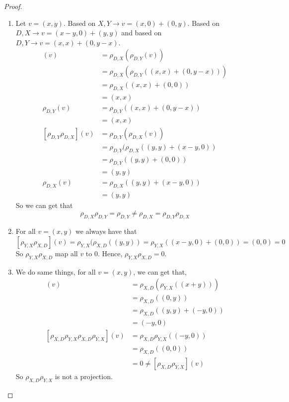 \documentclass[a4paper]{article}
\begin{document}
\begin{description}
\begin{proof}\
  \begin{enumerate}[ i) ]
    \item Let $v=(x,y)$. Based on $X, Y\to v=(x,0)+(0,y)$. Based on $D, X\to v=(x-y,0)+(y,y)$ and based on $D, Y\to v=(x,x)+(0,y-x)$.
    \begin{align*}
      [\rho_{D,X}\rho_{D,Y}](v)&=\rho_{D,X}(\rho_{D,Y}(v))\\
      &=\rho_{D,X}(\rho_{D,Y}((x,x)+(0,y-x)))\\
      &=\rho_{D,X}((x,x)+(0,0))\\
      &=(x,x)\\
      \rho_{D,Y}(v)&=\rho_{D,Y}((x,x)+(0,y-x))\\
      &=(x,x)\\
      [\rho_{D,Y}\rho_{D,X}](v)&=\rho_{D,Y}(\rho_{D,X}(v))\\
      &=\rho_{D,Y}(\rho_{D,X}((y,y)+(x-y,0))\\
      &=\rho_{D,Y}((y,y)+(0,0))\\
      &=(y,y)\\
      \rho_{D,X}(v)&=\rho_{D,X}((y,y)+(x-y,0))\\
      &=(y,y)
    \end{align*}
    So we can get that $$\rho_{D,X}\rho_{D,Y} = \rho_{D,Y} \neq \rho_{D,X} = \rho_{D,Y} \rho_{D,X}$$
    \item For all $v=(x,y)$ we always have that
    $$[\rho_{Y,X}\rho_{X,D}](v)=\rho_{Y,X}(\rho_{X,D}((y,y))=\rho_{Y,X}((x-y,0)+(0,0))=(0,0)=0$$
    So $\rho_{Y,X}\rho_{X,D}$ map all $v$ to $0$. Hence, $\rho_{Y,X}\rho_{X,D} = 0$.
    \item We do same things, for all $v=(x,y)$, we can get that,
    \begin{align*}
      [\rho_{X,D}\rho_{Y,X}](v)&=\rho_{X,D}(\rho_{Y,X}((x+y)))\\
      &=\rho_{X,D}((0,y))\\
      &=\rho_{X,D}((y,y)+(-y,0))\\
      &=(-y,0)\\
      [\rho_{X,D}\rho_{Y,X}\rho_{X,D}\rho_{Y,X}](v)&=\rho_{X,D}\rho_{Y,X}((-y,0))\\
      &=\rho_{X,D}((0,0))\\
      &=0\neq [\rho_{X,D}\rho_{Y,X}](v)
    \end{align*}
    So $\rho_{X,D}\rho_{Y,X}$ is not a projection.
  \end{enumerate}
\end{proof}


\end{description}
\end{document}
